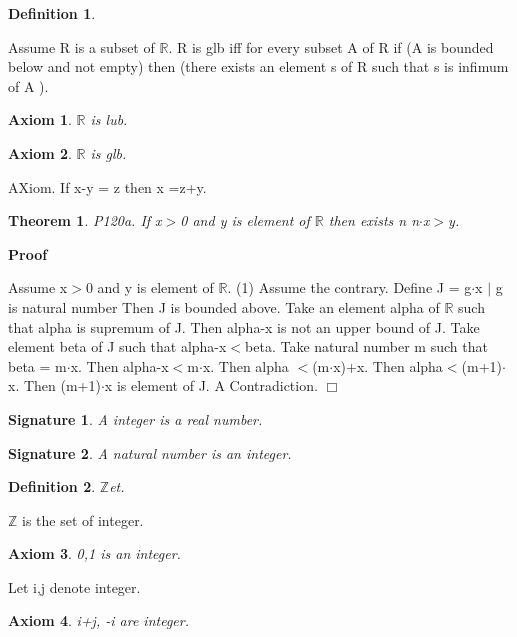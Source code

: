 \documentclass{article}
\newenvironment{forthel}{\begin{leftbar}}{\end{leftbar}}
\newenvironment{proof}{\noindent\textbf{Proof\ }}{\hspace*{\fill}$\Box$\medskip}
\newtheorem{axiom}{Axiom}
\newtheorem{theorem}{Theorem}
\newtheorem{definition}{Definition}
\newtheorem{signature}{Signature}
\begin{document}
\begin{forthel}
\begin{definition}
\end{definition}
Assume R is a subset of $\mathbb{R}$.
R is glb iff for every subset A of R
if (A is bounded below and not empty) then (there exists an element s of R such that s is infimum of A ).

\begin{axiom} $\mathbb{R}$ is lub.

\end{axiom}
\begin{axiom} $\mathbb{R}$ is glb.

\end{axiom}

AXiom. If x-y = z then x =z+y. 


\begin{theorem}
 P120a. If x$>$0 and y is element of $\mathbb{R}$ then exists n  n$\cdot$x$>$y.
\end{theorem}\begin{proof}

Assume x$>$0 and y is element of $\mathbb{R}$.
(1)	Assume the contrary.	
Define J = {g$\cdot$x $|$ g is natural number}
Then J is bounded above.
Take an element alpha of $\mathbb{R}$ such that alpha is supremum of J.
Then alpha-x is not an upper bound of J.
Take element beta of J such that alpha-x$<$beta.
Take natural number m such that beta = m$\cdot$x.
Then alpha-x$<$m$\cdot$x. Then alpha $<$(m$\cdot$x)+x.	
Then alpha$<$(m+1)$\cdot$x.
Then (m+1)$\cdot$x is element of J.
A Contradiction.
\end{proof}




\begin{signature} A integer is a real number.

\end{signature}
\begin{signature} A natural number is an integer.

\end{signature}

\begin{definition} $\mathbb{Z}$et.

\end{definition}
$\mathbb{Z}$ is the set of integer.
\begin{axiom} 0,1 is an integer.

\end{axiom}

Let i,j denote integer.
\begin{axiom} i+j, -i are integer.


\end{axiom}
\end{forthel}
\end{document}
